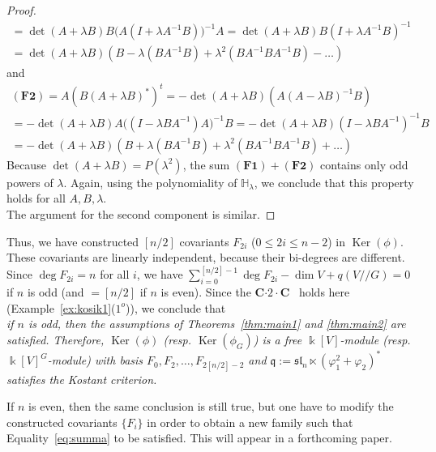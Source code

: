 \begin{ex}
\begin{proof}
\begin{multline*}
=\det(A{+}{\lambda} B)B\bigl(A(I{+}{\lambda} A^{-1} B)\bigr)^{-1}A
=\det(A{+}{\lambda} B)B(I{+}{\lambda} A^{-1} B)^{-1}\\
=\det(A{+}{\lambda} B)(B{-}{\lambda}(BA^{-1}B){+}{\lambda}^2(BA^{-1}BA^{-1}B)-\dots) 
\end{multline*}
and
\begin{multline*}  (\mathbf{F2})=
A(B(A{+}{\lambda} B)^*)^t=-\det(A{+}{\lambda} B)(A(A{-}{\lambda} B)^{-1}B)\\
=-\det(A{+}{\lambda} B)A\bigl((I{-}{\lambda} BA^{-1})A\bigr)^{-1}B 
=-\det(A{+}{\lambda} B)(I{-}{\lambda} BA^{-1})^{-1}B \\
=-\det(A{+}{\lambda} B)(B{+}{\lambda}(BA^{-1}B){+}{\lambda}^2(BA^{-1}BA^{-1}B)+\dots)
\end{multline*}
Because $\det(A{+}{\lambda} B)=P({\lambda}^2)$, the sum $(\mathbf{F1}){+}(\mathbf{F2})$ contains only odd powers of 
${\lambda}$. Again, using the polynomiality of $\mathbb H_{\lambda}$, we conclude that this property holds for all 
$A,B,{\lambda}$.
\\  \indent
The argument for the second component is similar.
\end{proof}
\noindent
Thus, we have constructed $[n/2]$ covariants $F_{2i}$ ($0{\leqslant} 2i {\leqslant} n-2$) in ${\operatorname{Ker}}(\phi)$. These 
covariants are linearly independent, because their bi-degrees are different. Since $\deg F_{2i}=n$ 
for all $i$, we have
$\sum_{i=0}^{[n/2]-1}\deg F_{2i}-\dim V+q(V{/\!\!/} G)=0$ if $n$ is odd (and $=[n/2]$ if $n$ is even).
Since the {\textsf{\bfseries C${\cdot}2{\cdot}$C}\ } holds here (Example~\ref{ex:kosik1}($1^o$)), we conclude that 
\\ \indent
{\sl if $n$ is odd, then the assumptions of Theorems~\ref{thm:main1} and \ref{thm:main2} are satisfied. Therefore, ${\operatorname{Ker}}(\phi)$ (resp. ${\operatorname{Ker}}(\phi_G)$) is a free ${\Bbbk}[V]$-module (resp. ${\Bbbk}[V]^G$-module) 
with basis $F_0,F_2,\dots,F_{2[n/2]-2}$ and ${{\mathfrak q}}:={{\mathfrak{sl}}_n}\ltimes ({\varphi}_1^2+{\varphi}_2)^*$ satisfies the Kostant 
criterion.}

{If $n$ is even, then the same conclusion is still true, but one have to modify the constructed covariants 
$\{F_i\}$ in order to obtain a new family such that Equality~\eqref{eq:summa} to be satisfied. This will 
appear in a forthcoming paper.}
\end{ex}

